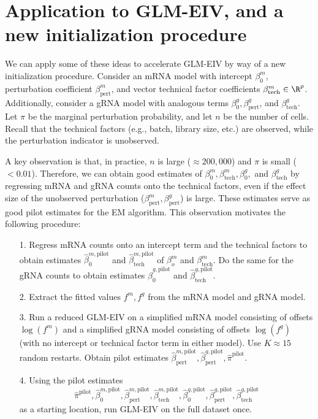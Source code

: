 \documentclass[12pt]{article}
\begin{document}
\section{Application to GLM-EIV, and a new initialization procedure}
 
 We can apply some of these ideas to accelerate GLM-EIV by way of a new initialization procedure. Consider an mRNA model with intercept $\beta^m_0$, perturbation coefficient $\beta^m_{\textrm{pert}}$, and vector technical factor coefficients $\beta^m_\textrm{tech} \in \R^p$. Additionally, consider a gRNA model with analogous terms $\beta^g_0, \beta^g_{\textrm{pert}}$, and $\beta^g_\textrm{tech}$. Let $\pi$ be the marginal perturbation probability, and let $n$ be the number of cells. Recall that the technical factors (e.g., batch, library size, etc.) are observed, while the perturbation indicator is unobserved.
 
A key observation is that, in practice, $n$ is large ($\approx 200,000$) and $\pi$ is small ($<0.01$). Therefore, we can obtain good estimates of $\beta_0^m, \beta^m_\textrm{tech}, \beta_0^g,$ and $\beta^g_\textrm{tech}$ by regressing mRNA and gRNA counts onto the technical factors, even if the effect size of the unobserved perturbation ($\beta^m_\textrm{pert}, \beta^g_{\textrm{pert}}$) is large. These estimates serve as good pilot estimates for the EM algorithm. This observation motivates the following procedure:
 
\begin{itemize}
\item[1.] Regress mRNA counts onto an intercept term and the technical factors to obtain estimates $\hat{\beta}_0^{m, \textrm{pilot}}$ and $\hat{\beta}_\textrm{tech}^{m,  \textrm{pilot}}$ of $\beta^m_o$ and $\beta^m_\textrm{tech}$. Do the same for the gRNA counts to obtain estimates $\hat{\beta}_0^{g, \textrm{pilot}}$ and $\hat{\beta}_\textrm{tech}^{g,  \textrm{pilot}}$.
\item[2.] Extract the fitted values $f^m, f^g$ from the mRNA model and gRNA model.
\item[3.] Run a reduced GLM-EIV on a simplified mRNA model consisting of offsets $\log(f^m)$ and a simplified gRNA model consisting of offsets $\log(f^g)$ (with no intercept or technical factor term in either model). Use $K \approx 15$ random restarts. Obtain pilot estimates $\hat{\beta}_{\textrm{pert}}^{m, \textrm{pilot}}, \hat{\beta}_{\textrm{pert}}^{g, \textrm{pilot}}, \hat{\pi}^{\textrm{pilot}}.$
\item[4.] Using the pilot estimates $$ \hat{\pi}^{\textrm{pilot}}, \hat{\beta}_0^{m, \textrm{pilot}}, \hat{\beta}_{\textrm{pert}}^{m, \textrm{pilot}}, \hat{\beta}_\textrm{tech}^{m,  \textrm{pilot}}, \hat{\beta}_0^{g, \textrm{pilot}}, \hat{\beta}_{\textrm{pert}}^{g, \textrm{pilot}},  \hat{\beta}_\textrm{tech}^{g,  \textrm{pilot}}$$ as a starting location, run GLM-EIV on the full dataset once.
\end{itemize} 
\end{document}
